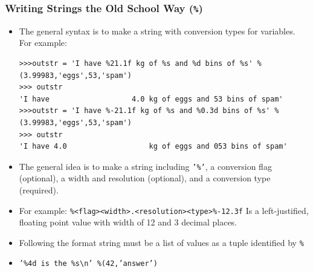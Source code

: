 \documentclass{beamer}
\begin{document}
\begin{frame}[fragile]
\frametitle{Writing Strings the Old School Way (\texttt{\%})}
\begin{small}
\begin{itemize}
\item The general syntax is to make a string with conversion types for variables. For example:
\begin{lstlisting}
>>>outstr = 'I have %21.1f kg of %s and %d bins of %s' %(3.99983,'eggs',53,'spam')
>>> outstr
'I have                   4.0 kg of eggs and 53 bins of spam'
>>>outstr = 'I have %-21.1f kg of %s and %0.3d bins of %s' %(3.99983,'eggs',53,'spam')
>>> outstr
'I have 4.0                   kg of eggs and 053 bins of spam'

\end{lstlisting}
\item The general idea is to make a string including \texttt{'\%'}, a conversion flag (optional), a width and resolution (optional), and a conversion type (required).
\item[] For example: \newline{}
\texttt{\%<flag><width>.<resolution><type>}\newline{}\texttt{\%-12.3f} Is a left-justified, floating point value with width of 12 and 3 decimal places.
\item Following the format string must be a list of values as a tuple identified by \texttt{\%}

\item[] \texttt{'\%4d is the \%s\textbackslash{}n' \%(42,'answer')}
\end{itemize}
\end{small}
\end{frame}
\end{document}
